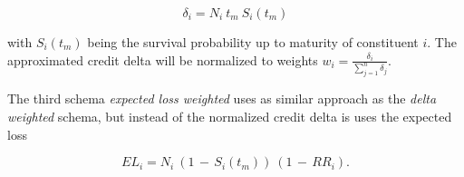 $$ \delta_i = N_i \: t_m \: S_i(t_m) $$

with $S_i(t_m)$ being the survival probability up to maturity of constituent $i$. 
The approximated credit delta will be normalized to weights $w_i = \frac{\delta_i}{\sum_{j=1}^n \delta_j}$.

The third schema \emph{expected loss weighted} uses as similar approach as the \emph{delta weighted} schema, but instead of the normalized credit delta is uses the expected loss

$$EL_i = N_i \: (1 \, - \, S_i(t_m)) \: (1 \, - \, RR_i).$$




